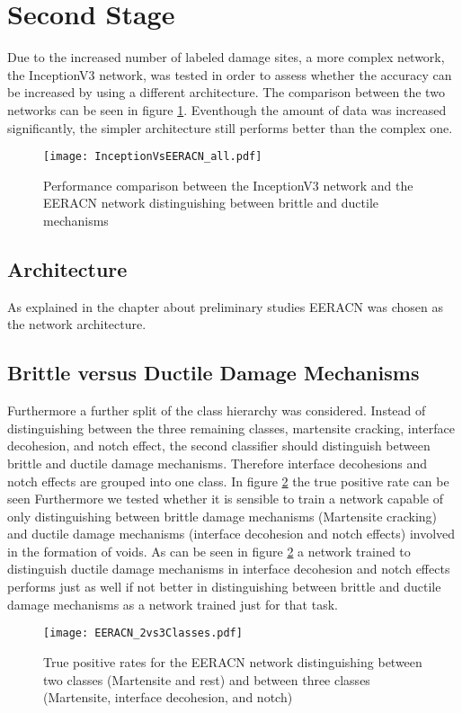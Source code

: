 \section{Second Stage}
Due to the increased number of labeled damage sites, a more complex network, the InceptionV3 network, was tested in order to assess whether the accuracy can be increased by using a different architecture. The comparison between the two networks can be seen in figure \ref{fig:InVsEE}. Eventhough the amount of data was increased significantly, the simpler architecture still performs better than the complex one. 

\begin{figure}
  \texttt{[image: InceptionVsEERACN\_all.pdf]}
\caption{Performance comparison between the InceptionV3 network and the EERACN network distinguishing between brittle and ductile mechanisms}
\label{fig:InVsEE}
\end{figure}

\subsection{Architecture}
As explained in the chapter about preliminary studies EERACN was chosen as the network architecture.


\subsection{Brittle versus Ductile Damage Mechanisms}
Furthermore a further split of the class hierarchy was considered. Instead of distinguishing between the three remaining classes, martensite cracking, interface decohesion, and notch effect, the second classifier should distinguish between brittle and ductile damage mechanisms. Therefore interface decohesions and notch effects are grouped into one class. In figure \ref{fig:2vs3Classes} the true positive rate can be seen 
Furthermore we tested whether it is sensible to train a network capable of only distinguishing between brittle damage mechanisms (Martensite cracking) and ductile damage mechanisms (interface decohesion and notch effects) involved in the formation of voids. As can be seen in figure \ref{fig:2vs3Classes} a network trained to distinguish ductile damage mechanisms in interface decohesion and notch effects performs just as well if not better in distinguishing between brittle and ductile damage mechanisms as a network trained just for that task.

\begin{figure}
  \texttt{[image: EERACN\_2vs3Classes.pdf]}
\caption{True positive rates for the EERACN network distinguishing between two classes (Martensite and rest) and between three classes (Martensite, interface decohesion, and notch)}
\label{fig:2vs3Classes}
\end{figure}

